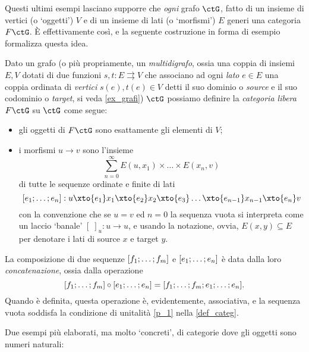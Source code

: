 Questi ultimi esempi lasciano supporre che \emph{ogni} grafo \(\ctG\), fatto di un insieme di vertici (o `oggetti') \(V\) e di un insieme di lati (o `morfismi') \(E\) generi una categoria \(F\ctG\). \`E effettivamente così, e la seguente costruzione in forma di esempio formalizza questa idea.
\begin{example}\label{ex_cat_libera}
	Dato un grafo (o più propriamente, un \emph{multidigrafo}, ossia una coppia di insiemi \(E,V\) dotati di due funzioni \(s,t : E\rightrightarrows V\) che associano ad ogni \emph{lato} \(e\in E\) una coppia ordinata di \emph{vertici} \(s(e),t(e)\in V\) detti il suo dominio o \emph{source} e il suo codominio o \emph{target}, si veda \ref{ex_grafi}) \(\ctG\) possiamo definire la \emph{categoria libera} \(F\ctG\) su \(\ctG\) come segue:
	\begin{itemize}
		\item gli oggetti di \(F\ctG\) sono esattamente gli elementi di \(V\);
		\item i morfismi \(u\to v\) sono l'insieme
		      \[\sum_{n=0}^\infty E(u,x_1)\times\dots\times E(x_n,v)\]
		      di tutte le sequenze ordinate e finite di lati
		      \[ [\tup en;] : u \xto{e_1} x_1 \xto{e_2} x_2\xto{e_3} \dots\xto{e_{n-1}} x_{n-1}\xto{e_n} v\]
		      con la convenzione che se \(u=v\) ed \(n=0\) la sequenza vuota si interpreta come un laccio `banale' \([\;]_u : u\to u\), e usando la notazione, ovvia, \(E(x,y)\subseteq E\) per denotare i lati di source \(x\) e target \(y\).
	\end{itemize}
	La composizione di due sequenze \([\tup fm;]\) e \([\tup en;]\) è data dalla loro \emph{concatenazione}, ossia dalla operazione
	\[[\tup fm;]\circ[\tup en;] = [\tup fm;;\tup en;].\]
	Quando è definita, questa operazione è, evidentemente, associativa, e la sequenza vuota soddisfa la condizione di unitalità \ref{p_1} nella \ref{def_categ}.
\end{example}
Due esempi più elaborati, ma molto `concreti', di categorie dove gli oggetti sono numeri naturali:
